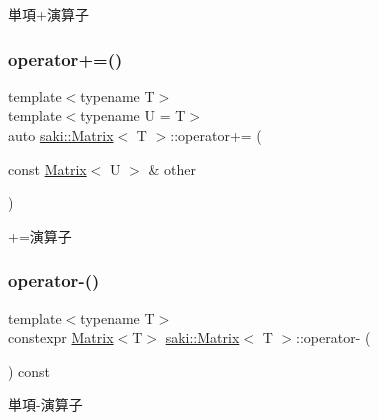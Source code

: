 単項+演算子 

\mbox{\label{classsaki_1_1_matrix_a06e54f0ce6ff0cd591725a753d9a4c60}} 
\subsubsection{\texorpdfstring{operator+=()}{operator+=()}}
{\footnotesize\ttfamily template$<$typename T$>$ \\
template$<$typename U  = T$>$ \\
auto \mbox{\hyperlink{classsaki_1_1_matrix}{saki\+::\+Matrix}}$<$ T $>$\+::operator+= (\begin{DoxyParamCaption}\item[{const \mbox{\hyperlink{classsaki_1_1_matrix}{Matrix}}$<$ U $>$ \&}]{other }\end{DoxyParamCaption})\hspace{0.3cm}{\ttfamily [inline]}}



+=演算子 

\mbox{\label{classsaki_1_1_matrix_ab56b2934659f55200a3f7a18e48306b5}} 
\subsubsection{\texorpdfstring{operator-\/()}{operator-()}}
{\footnotesize\ttfamily template$<$typename T$>$ \\
constexpr \mbox{\hyperlink{classsaki_1_1_matrix}{Matrix}}$<$T$>$ \mbox{\hyperlink{classsaki_1_1_matrix}{saki\+::\+Matrix}}$<$ T $>$\+::operator-\/ (\begin{DoxyParamCaption}{ }\end{DoxyParamCaption}) const\hspace{0.3cm}{\ttfamily [inline]}}



単項-\/演算子 

\mbox{\label{classsaki_1_1_matrix_a782a94fb837a9973fed259c55e6817f1}} 
